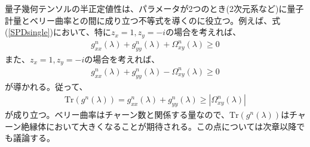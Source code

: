 \documentclass[12pt]{jsbook}
\begin{document}
量子幾何テンソルの半正定値性は、パラメータが2つのとき(2次元系など)に量子計量とベリー曲率との間に成り立つ不等式を導くのに役立つ\cite{Peotta2015}。例えば、式(\ref{SPDsingle})において、特に$z_x=1,z_y=-i$の場合を考えれば、
\begin{eqnarray}
    g^n_{xx}(\lambda) + g^n_{yy}(\lambda) + \Omega^n_{xy}(\lambda)\geq 0
\end{eqnarray}
また、$z_x=1,z_y=-i$の場合を考えれば、
\begin{eqnarray}
    g^n_{xx}(\lambda) + g^n_{yy}(\lambda) - \Omega^n_{xy}(\lambda)\geq 0
\end{eqnarray}
が導かれる。従って、
\begin{eqnarray}
\label{Trgneq}
    \mathrm{Tr}(g^n(\lambda)) = g_{xx}^n(\lambda) + g_{yy}^n(\lambda)\geq |\Omega^n_{xy}(\lambda)| 
\end{eqnarray}
が成り立つ。ベリー曲率はチャーン数と関係する量なので、$\mathrm{Tr}(g^n(\lambda))$はチャーン絶縁体において大きくなることが期待される。この点については次章以降でも議論する。
\end{document}
